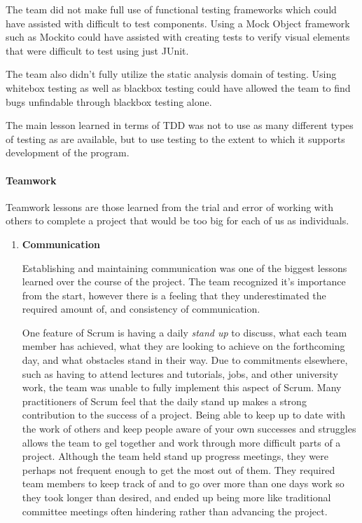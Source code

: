 \documentclass[11pt]{article}
\begin{document}
{\begin{enumerate}
	The team did not make full use of functional testing frameworks which could have assisted with difficult to test components. Using a Mock Object framework such as Mockito could have assisted with creating tests to verify visual elements that were difficult to test using just JUnit.
	
	The team also didn't fully utilize the static analysis domain of testing. Using whitebox testing as well as blackbox testing could have allowed the team to find bugs unfindable through blackbox testing alone.
	
	The main lesson learned in terms of TDD was not to use as many different types of testing as are available, but to use testing to the extent to which it supports development of the program.
	
	
\end{enumerate}


\pagebreak
\paragraph{Teamwork}

Teamwork lessons are those learned from the trial and error of working with others to complete a project that would be too big for each of us as individuals.

\begin{enumerate}
	
	\item \textbf{Communication}
	
	Establishing and maintaining communication was one of the biggest lessons learned over the course of the project. The team recognized it's importance from the start, however there is a feeling that they underestimated the required amount of, and consistency of communication.
	
	One feature of Scrum is having a daily \textit{stand up} to discuss, what each team member has achieved, what they are looking to achieve on the forthcoming day, and what obstacles stand in their way. Due to commitments elsewhere, such as having to attend lectures and tutorials, jobs, and other university work, the team was unable to fully implement this aspect of Scrum. Many practitioners of Scrum feel that the daily stand up makes a strong contribution to the success of a project. Being able to keep up to date with the work of others and keep people aware of your own successes and struggles allows the team to gel together and work through more difficult parts of a project. Although the team held stand up progress meetings, they were perhaps not frequent enough to get the most out of them. They required team members to keep track of and to go over more than one days work so they took longer than desired, and ended up being more like traditional committee meetings often hindering rather than advancing the project.
	

\end{enumerate}}
\end{document}
